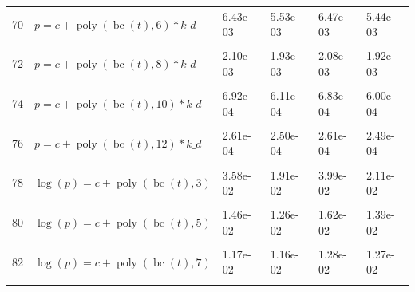 \documentclass[12pt,a4paper]{article}
\DeclareMathOperator{\bc}{bc}
\DeclareMathOperator{\poly}{poly}
\begin{document}
\begin{longtable}[t]{ll>{\raggedleft\arraybackslash}p{2cm}>{\raggedleft\arraybackslash}p{2cm}>{\raggedleft\arraybackslash}p{2cm}>{\raggedleft\arraybackslash}p{2cm}}
70 & $p = c + \poly\left( \bc(t), 6 \right) * k\_d$ & 6.43e-03 & 5.53e-03 & 6.47e-03 & 5.44e-03\\
\cellcolor{gray!6}{71} & \cellcolor{gray!6}{$p = c + \poly\left( \bc(t), 7 \right) * k\_d$} & \cellcolor{gray!6}{5.48e-03} & \cellcolor{gray!6}{4.61e-03} & \cellcolor{gray!6}{4.39e-03} & \cellcolor{gray!6}{4.01e-03}\\
72 & $p = c + \poly\left( \bc(t), 8 \right) * k\_d$ & 2.10e-03 & 1.93e-03 & 2.08e-03 & 1.92e-03\\
\cellcolor{gray!6}{73} & \cellcolor{gray!6}{$p = c + \poly\left( \bc(t), 9 \right) * k\_d$} & \cellcolor{gray!6}{1.79e-03} & \cellcolor{gray!6}{1.63e-03} & \cellcolor{gray!6}{1.40e-03} & \cellcolor{gray!6}{1.33e-03}\\
74 & $p = c + \poly\left( \bc(t), 10 \right) * k\_d$ & 6.92e-04 & 6.11e-04 & 6.83e-04 & 6.00e-04\\
\cellcolor{gray!6}{75} & \cellcolor{gray!6}{$p = c + \poly\left( \bc(t), 11 \right) * k\_d$} & \cellcolor{gray!6}{5.61e-04} & \cellcolor{gray!6}{4.93e-04} & \cellcolor{gray!6}{4.35e-04} & \cellcolor{gray!6}{4.11e-04}\\
76 & $p = c + \poly\left( \bc(t), 12 \right) * k\_d$ & 2.61e-04 & 2.50e-04 & 2.61e-04 & 2.49e-04\\
\cellcolor{gray!6}{77} & \cellcolor{gray!6}{$p = c + \poly\left( \bc(t), 13 \right) * k\_d$} & \cellcolor{gray!6}{2.11e-04} & \cellcolor{gray!6}{2.02e-04} & \cellcolor{gray!6}{1.87e-04} & \cellcolor{gray!6}{1.84e-04}\\
78 & $\log(p) = c + \poly\left( \bc(t), 3 \right)$ & 3.58e-02 & 1.91e-02 & 3.99e-02 & 2.11e-02\\
\cellcolor{gray!6}{79} & \cellcolor{gray!6}{$\log(p) = c + \poly\left( \bc(t), 4 \right)$} & \cellcolor{gray!6}{2.33e-02} & \cellcolor{gray!6}{2.32e-02} & \cellcolor{gray!6}{2.59e-02} & \cellcolor{gray!6}{2.58e-02}\\
80 & $\log(p) = c + \poly\left( \bc(t), 5 \right)$ & 1.46e-02 & 1.26e-02 & 1.62e-02 & 1.39e-02\\
\cellcolor{gray!6}{81} & \cellcolor{gray!6}{$\log(p) = c + \poly\left( \bc(t), 6 \right)$} & \cellcolor{gray!6}{1.13e-02} & \cellcolor{gray!6}{1.12e-02} & \cellcolor{gray!6}{1.24e-02} & \cellcolor{gray!6}{1.24e-02}\\
82 & $\log(p) = c + \poly\left( \bc(t), 7 \right)$ & 1.17e-02 & 1.16e-02 & 1.28e-02 & 1.27e-02\\
\cellcolor{gray!6}{83} & \cellcolor{gray!6}{$\log(p) = c + \poly\left( \bc(t), 8 \right)$} & \cellcolor{gray!6}{1.12e-02} & \cellcolor{gray!6}{1.12e-02} & \cellcolor{gray!6}{1.23e-02} & \cellcolor{gray!6}{1.23e-02}\\

\end{longtable}
\end{document}
